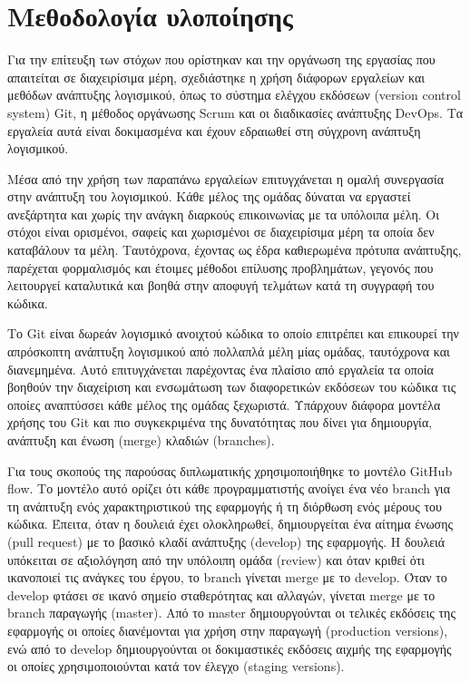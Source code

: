 \section{Μεθοδολογία υλοποίησης} \label{subsection:4-2-implementation-methodology}

Για την επίτευξη των στόχων που ορίστηκαν και την οργάνωση της εργασίας που απαιτείται σε διαχειρίσιμα μέρη, σχεδιάστηκε η χρήση διάφορων εργαλείων και μεθόδων ανάπτυξης λογισμικού, όπως το σύστημα ελέγχου εκδόσεων (version control system) Git, η μέθοδος οργάνωσης Scrum και οι διαδικασίες ανάπτυξης DevOps. Τα εργαλεία αυτά είναι δοκιμασμένα και έχουν εδραιωθεί στη σύγχρονη ανάπτυξη λογισμικού.

Μέσα από την χρήση των παραπάνω εργαλείων επιτυγχάνεται η ομαλή συνεργασία στην ανάπτυξη του λογισμικού. Κάθε μέλος της ομάδας δύναται να εργαστεί ανεξάρτητα και χωρίς την ανάγκη διαρκούς επικοινωνίας με τα υπόλοιπα μέλη. Οι στόχοι είναι ορισμένοι, σαφείς και χωρισμένοι σε διαχειρίσιμα μέρη τα οποία δεν καταβάλουν τα μέλη. Ταυτόχρονα, έχοντας ως έδρα καθιερωμένα πρότυπα ανάπτυξης, παρέχεται φορμαλισμός και έτοιμες μέθοδοι επίλυσης προβλημάτων, γεγονός που λειτουργεί καταλυτικά και βοηθά στην αποφυγή τελμάτων κατά τη συγγραφή του κώδικα.

Το Git είναι δωρεάν λογισμικό ανοιχτού κώδικα το οποίο επιτρέπει και επικουρεί την απρόσκοπτη ανάπτυξη λογισμικού από πολλαπλά μέλη μίας ομάδας, ταυτόχρονα και διανεμημένα. Αυτό επιτυγχάνεται παρέχοντας ένα πλαίσιο από εργαλεία τα οποία βοηθούν την διαχείριση και ενσωμάτωση των διαφορετικών εκδόσεων του κώδικα τις οποίες αναπτύσσει κάθε μέλος της ομάδας ξεχωριστά. Υπάρχουν διάφορα μοντέλα χρήσης του Git και πιο συγκεκριμένα της δυνατότητας που δίνει για δημιουργία, ανάπτυξη και ένωση (merge) κλαδιών (branches).

Για τους σκοπούς της παρούσας διπλωματικής χρησιμοποιήθηκε το μοντέλο GitHub flow\cite{4.2-github-flow}. Το μοντέλο αυτό ορίζει ότι κάθε προγραμματιστής ανοίγει ένα νέο branch για τη ανάπτυξη ενός χαρακτηριστικού της εφαρμογής ή τη διόρθωση ενός μέρους του κώδικα. Έπειτα, όταν η δουλειά έχει ολοκληρωθεί, δημιουργείται ένα αίτημα ένωσης (pull request) με το βασικό κλαδί ανάπτυξης (develop) της εφαρμογής. Η δουλειά υπόκειται σε αξιολόγηση από την υπόλοιπη ομάδα (review) και όταν κριθεί ότι ικανοποιεί τις ανάγκες του έργου, το branch γίνεται merge με το develop. Όταν το develop φτάσει σε ικανό σημείο σταθερότητας και αλλαγών, γίνεται merge με το branch παραγωγής (master). Από το master δημιουργούνται οι τελικές εκδόσεις της εφαρμογής οι οποίες διανέμονται για χρήση στην παραγωγή (production versions), ενώ από το develop δημιουργούνται οι δοκιμαστικές εκδόσεις αιχμής της εφαρμογής οι οποίες χρησιμοποιούνται κατά τον έλεγχο (staging versions).

